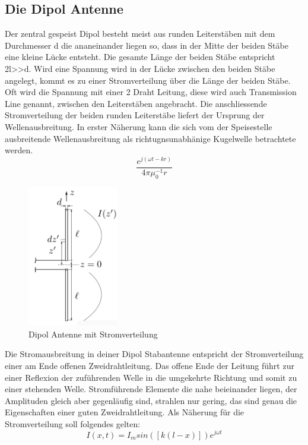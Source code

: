 \subsection{Die Dipol Antenne}
Der zentral gespeist Dipol besteht meist aus runden Leiterstäben mit dem Durchmesser d die ananeinander liegen so, dass in der Mitte der beiden Stäbe eine kleine Lücke entsteht. Die gesamte Länge der beiden Stäbe entspricht 2l>>d. Wird eine Spannung wird in der Lücke zwischen den beiden Stäbe angelegt, kommt es zu einer Stromverteilung über die Länge der beiden Stäbe. Oft wird die Spannung mit einer 2 Draht Leitung,  diese wird auch Transmission Line genannt, zwischen den Leiterstäben angebracht. Die anschliessende Stromverteilung der beiden runden Leiterstäbe liefert der Ursprung der Wellenausbreitung. In erster Näherung kann die sich vom der Speisestelle ausbreitende Wellenausbreitung als richtugnsunabhänige Kugelwelle betrachtete werden.
\begin{equation}
\frac{e^{j(\omega t-kr)}}{4\pi \mu_{0}^{-1}r}
\end{equation}

\begin{figure}[!htb]
	\centering
	\includegraphics[width=4cm]{content/bilder/Dipol_EMANT_S42.pdf}%
	\caption{Dipol Antenne mit Stromverteilung}
	\label{FitzDipol}
\end{figure}

Die Stromausbreitung in deiner Dipol Stabantenne entspricht der Stromverteilung einer am Ende offenen Zweidrahtleitung. Das offene Ende der Leitung führt zur einer Reflexion der zuführenden Welle in die umgekehrte Richtung und somit zu einer stehenden Welle. Stromführende Elemente die nahe beieinander liegen, der Amplituden gleich aber gegenläufig sind, strahlen nur gering, das sind genau die Eigenschaften einer guten Zweidrahtleitung.
Als Näherung für die Stromverteilung soll folgendes gelten:
\begin{equation}
I(x,t) =I_{m}sin([k(l-x)])e^{j\omega t}
\end{equation}

